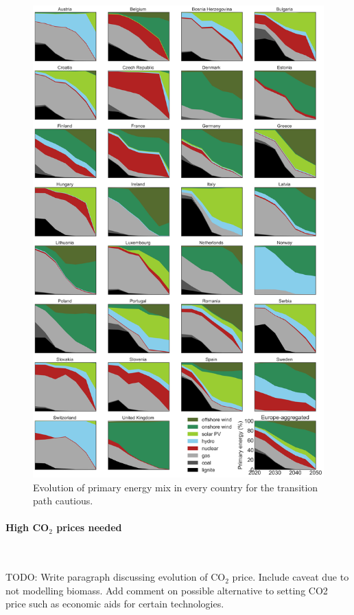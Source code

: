 \documentclass[5p]{elsarticle} %
\begin{document}
\begin{figure}[!h]
\centering
\includegraphics[width=14cm]{figures/primary_energy_go.png}
\caption{Evolution of primary energy mix in every country for the transition path cautious.} \label{fig_primary_energy} 
\end{figure}

\paragraph{\textbf{High CO$_2$ prices needed}} \

\textcolor[rgb]{1,0,0}{TODO: Write paragraph discussing evolution of CO$_2$ price. Include caveat due to not modelling biomass. Add comment on possible alternative to setting CO2 price such as economic aids for certain technologies. }
\end{document}
